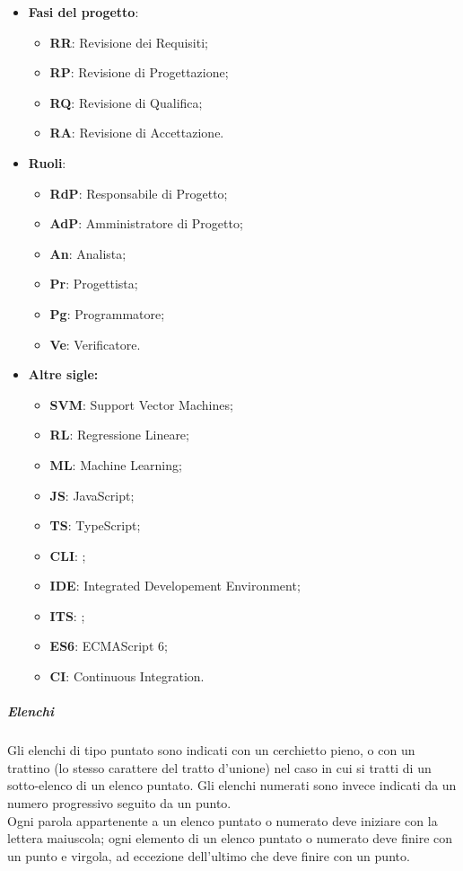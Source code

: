 \documentclass[../norme-di-progetto.tex]{subfiles}
\begin{document}
\begin{itemize}
  \item \textbf{Fasi del progetto}:
  \begin{itemize}
  \item \textbf{RR}: Revisione dei Requisiti;
  \item \textbf{RP}: Revisione di Progettazione;
  \item \textbf{RQ}: Revisione di Qualifica;
  \item \textbf{RA}: Revisione di Accettazione.
  \end{itemize}
  \item \textbf{Ruoli}:
  \begin{itemize}
  \item \textbf{RdP}: Responsabile di Progetto;
  \item \textbf{AdP}: Amministratore di Progetto;
  \item \textbf{An}: Analista;
  \item \textbf{Pr}: Progettista;
  \item \textbf{Pg}: Programmatore;
  \item \textbf{Ve}: Verificatore.
  \end{itemize}
  \item \textbf{Altre sigle:}
  \begin{itemize}
    \item \textbf{SVM}: Support Vector Machines;
    \item \textbf{RL}: Regressione Lineare;
    \item \textbf{ML}: Machine Learning;
    \item \textbf{JS}: JavaScript;
    \item \textbf{TS}: TypeScript;
    \item \textbf{CLI}: ;
    \item \textbf{IDE}: Integrated Developement Environment;
    \item \textbf{ITS}: ;
    \item \textbf{ES6}: ECMAScript 6;
    \item \textbf{CI}: Continuous Integration.
  \end{itemize}
\end{itemize}

\subparagraph*{Elenchi}
Gli elenchi di tipo puntato sono indicati con un cerchietto pieno, o con un trattino (lo stesso carattere del tratto d'unione) nel caso in cui si tratti di un sotto-elenco di un elenco puntato. Gli elenchi numerati sono invece indicati da un numero progressivo seguito da un punto. \\
Ogni parola appartenente a un elenco puntato o numerato deve iniziare con la lettera maiuscola; ogni elemento di un elenco puntato o numerato deve finire con un punto e virgola, ad eccezione dell'ultimo che deve finire con un punto.
\end{document}
